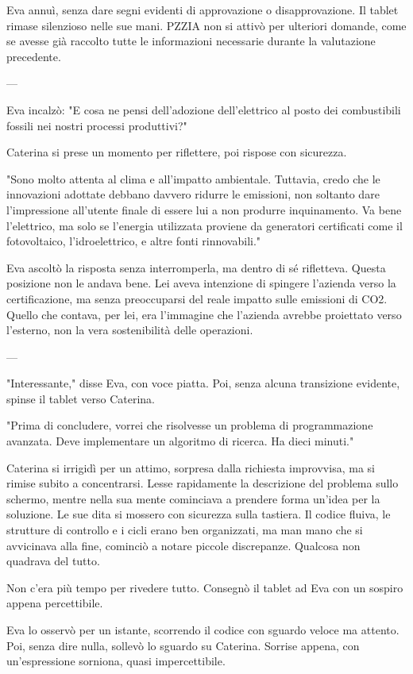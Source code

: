 Eva annuì, senza dare segni evidenti di approvazione o disapprovazione. Il tablet rimase silenzioso nelle sue mani. PZZIA non si attivò per ulteriori domande, come se avesse già raccolto tutte le informazioni necessarie durante la valutazione precedente.

---

Eva incalzò: "E cosa ne pensi dell'adozione dell'elettrico al posto dei combustibili fossili nei nostri processi produttivi?"

Caterina si prese un momento per riflettere, poi rispose con sicurezza.

"Sono molto attenta al clima e all'impatto ambientale. Tuttavia, credo che le innovazioni adottate debbano davvero ridurre le emissioni, non soltanto dare l'impressione all'utente finale di essere lui a non produrre inquinamento. Va bene l'elettrico, ma solo se l'energia utilizzata proviene da generatori certificati come il fotovoltaico, l'idroelettrico, e altre fonti rinnovabili."

Eva ascoltò la risposta senza interromperla, ma dentro di sé rifletteva. Questa posizione non le andava bene. Lei aveva intenzione di spingere l'azienda verso la certificazione, ma senza preoccuparsi del reale impatto sulle emissioni di CO2. Quello che contava, per lei, era l'immagine che l'azienda avrebbe proiettato verso l'esterno, non la vera sostenibilità delle operazioni.

---

"Interessante," disse Eva, con voce piatta. Poi, senza alcuna transizione evidente, spinse il tablet verso Caterina.

"Prima di concludere, vorrei che risolvesse un problema di programmazione avanzata. Deve implementare un algoritmo di ricerca. Ha dieci minuti."

Caterina si irrigidì per un attimo, sorpresa dalla richiesta improvvisa, ma si rimise subito a concentrarsi. Lesse rapidamente la descrizione del problema sullo schermo, mentre nella sua mente cominciava a prendere forma un'idea per la soluzione. Le sue dita si mossero con sicurezza sulla tastiera. Il codice fluiva, le strutture di controllo e i cicli erano ben organizzati, ma man mano che si avvicinava alla fine, cominciò a notare piccole discrepanze. Qualcosa non quadrava del tutto.

Non c’era più tempo per rivedere tutto. Consegnò il tablet ad Eva con un sospiro appena percettibile.

Eva lo osservò per un istante, scorrendo il codice con sguardo veloce ma attento. Poi, senza dire nulla, sollevò lo sguardo su Caterina. Sorrise appena, con un’espressione sorniona, quasi impercettibile.

